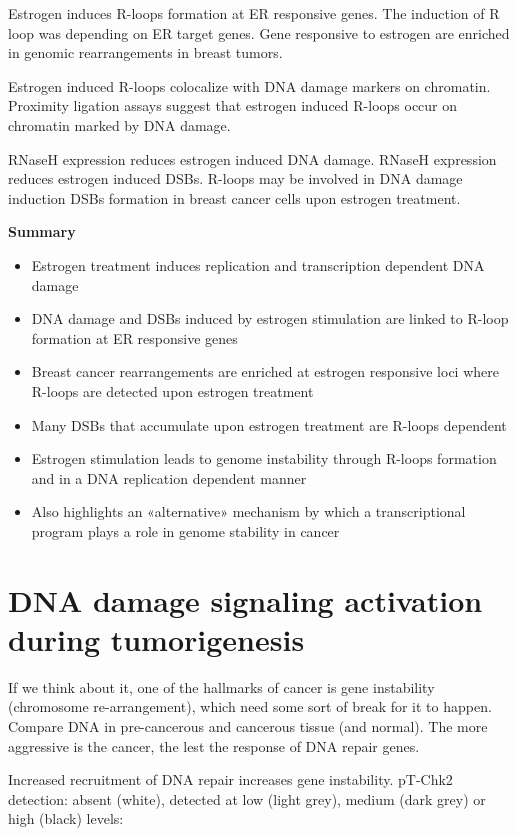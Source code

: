 Estrogen induces R-loops formation at ER responsive genes. The induction of R loop was depending on ER target genes. Gene responsive to estrogen are enriched in genomic rearrangements in breast tumors. 

Estrogen induced R-loops colocalize with DNA damage markers on chromatin. Proximity ligation assays suggest that estrogen induced R-loops occur on chromatin marked by DNA damage.

RNaseH expression reduces estrogen induced DNA damage. RNaseH expression reduces estrogen induced DSBs. R-loops may be involved in DNA damage induction DSBs formation in breast cancer cells upon estrogen treatment.

\textbf{Summary}
\begin{itemize}
\tightlist
\item
  Estrogen treatment induces replication and transcription dependent DNA damage
\item
  DNA damage and DSBs induced by estrogen stimulation are linked to R-loop formation at ER responsive genes
\item
  Breast cancer rearrangements are enriched at estrogen responsive loci where R-loops are detected upon estrogen treatment
\item
  Many DSBs that accumulate upon estrogen treatment are R-loops dependent
\item
  Estrogen stimulation leads to genome instability through R-loops formation and in a DNA
  replication dependent manner
\item
  Also highlights an «alternative» mechanism by which a transcriptional program plays a role in genome stability in cancer
\end{itemize}

\hypertarget{dna-damage-signaling-activation-during-tumorigenesis}{%
\section{DNA damage signaling activation during
tumorigenesis}\label{dna-damage-signaling-activation-during-tumorigenesis}}

If we think about it, one of the hallmarks of cancer is gene instability
(chromosome re-arrangement), which need some sort of break for it to
happen. Compare DNA in pre-cancerous and cancerous tissue (and normal).
The more aggressive is the cancer, the lest the response of DNA repair
genes. 

Increased recruitment of DNA repair increases gene instability. pT-Chk2
detection: absent (white), detected at low (light grey), medium (dark
grey) or high (black) levels:

